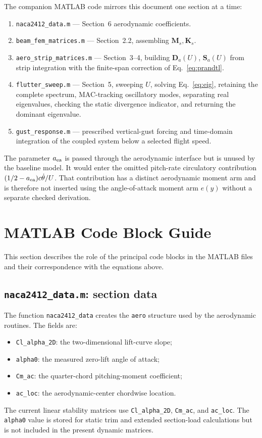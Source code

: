 \documentclass[11pt]{article}
\begin{document}
The companion MATLAB code mirrors this document one section at a time:
\begin{enumerate}
\item \texttt{naca2412\_data.m} --- Section~6 aerodynamic coefficients.
\item \texttt{beam\_fem\_matrices.m} --- Section~2.2, assembling $\bm M_s,\bm K_s$.
\item \texttt{aero\_strip\_matrices.m} --- Section~3--4, building $\bm D_a(U)$,
$\bm S_a(U)$ from strip integration with the finite-span correction of
Eq.~\eqref{eq:prandtl}.
\item \texttt{flutter\_sweep.m} --- Section~5, sweeping $U$, solving
Eq.~\eqref{eq:eig}, retaining the complete spectrum, MAC-tracking oscillatory modes,
separating real eigenvalues, checking the static divergence indicator, and returning
the dominant eigenvalue.
\item \texttt{gust\_response.m} --- prescribed vertical-gust forcing and time-domain
integration of the coupled system below a selected flight speed.
\end{enumerate}

The parameter $a_{\rm ea}$ is passed through the aerodynamic interface but is unused by
the baseline model. It would enter the omitted pitch-rate circulatory contribution
$({1}/{2}-a_{\rm ea})c\dot\theta/U$. That contribution has a distinct aerodynamic
moment arm and is therefore not inserted using the angle-of-attack moment arm $e(y)$
without a separate checked derivation.

\section{MATLAB Code Block Guide}

This section describes the role of the principal code blocks in the MATLAB files and
their correspondence with the equations above.

\subsection{\texttt{naca2412\_data.m}: section data}

The function \texttt{naca2412\_data} creates the \texttt{aero} structure used by the
aerodynamic routines. The fields are:
\begin{itemize}
\item \texttt{Cl\_alpha\_2D}: the two-dimensional lift-curve slope;
\item \texttt{alpha0}: the measured zero-lift angle of attack;
\item \texttt{Cm\_ac}: the quarter-chord pitching-moment coefficient;
\item \texttt{ac\_loc}: the aerodynamic-center chordwise location.
\end{itemize}
The current linear stability matrices use \texttt{Cl\_alpha\_2D}, \texttt{Cm\_ac}, and
\texttt{ac\_loc}. The \texttt{alpha0} value is stored for static trim and extended
section-load calculations but is not included in the present dynamic matrices.
\end{document}
